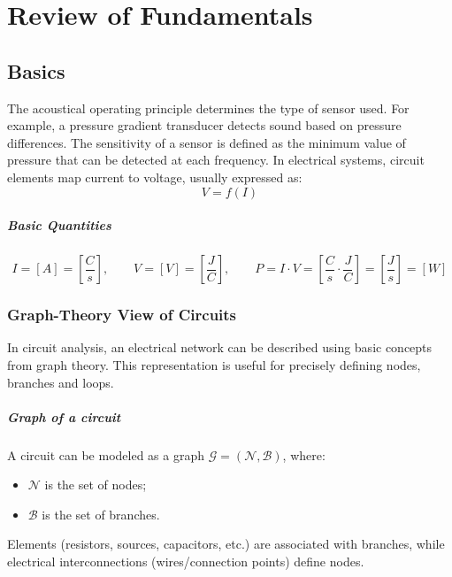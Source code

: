
\graphicspath{{00_Images/01_chapter/}}

\chapter{Review of Fundamentals}
\label{ch:rev}

\section{Basics}

The acoustical operating principle determines the type of sensor used. For example, a pressure gradient transducer detects sound based on pressure differences. The sensitivity of a sensor is defined as the minimum value of pressure that can be detected at each frequency. In electrical systems, circuit elements map current to voltage, usually expressed as:
\[
V = f(I)
\]

\paragraph{Basic Quantities}
\[
I = [A] = \left[\frac{C}{s}\right], \qquad
V = [V] = \left[\frac{J}{C}\right], \qquad
P = I \cdot V = \left[\frac{C}{s} \cdot \frac{J}{C}\right] = \left[\frac{J}{s}\right] = [W]
\]

\subsection{Graph-Theory View of Circuits}

In circuit analysis, an electrical network can be described using basic concepts from graph theory. This representation is useful for precisely defining nodes, branches and loops.

\paragraph{Graph of a circuit} A circuit can be modeled as a graph \( \mathcal{G} = (\mathcal{N}, \mathcal{B}) \), where:

\begin{itemize}
    \item \( \mathcal{N} \) is the set of nodes;
    \item \( \mathcal{B} \) is the set of branches.
\end{itemize}

Elements (resistors, sources, capacitors, etc.) are associated with branches, while electrical interconnections (wires/connection points) define nodes.

